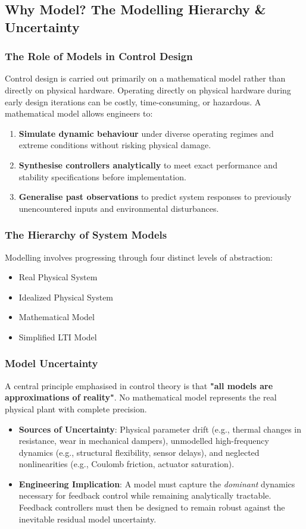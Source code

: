 \documentclass[12pt,onecolumn,twoside ]{article}
\begin{document}
	\subsection{Why Model? The Modelling Hierarchy \& Uncertainty}
	\subsubsection{The Role of Models in Control Design}
	Control design is carried out primarily on a mathematical model rather than directly on physical hardware. Operating directly on physical hardware during early design iterations can be costly, time-consuming, or hazardous. A mathematical model allows engineers to:
	\begin{enumerate}
		\item
		\textbf{Simulate dynamic behaviour} under diverse operating regimes and extreme conditions without risking physical damage.
		\item
		\textbf{Synthesise controllers analytically} to meet exact performance and stability specifications before implementation.
		\item
		\textbf{Generalise past observations} to predict system responses to previously unencountered inputs and environmental disturbances.
	\end{enumerate}
	\subsubsection{The Hierarchy of System Models}
	Modelling involves progressing through four distinct levels of abstraction:
	
	\begin{itemize}
		\item Real Physical System
		\item Idealized Physical System
		\item Mathematical Model
		\item Simplified LTI Model
	\end{itemize}
	
	\subsubsection{Model Uncertainty}
	A central principle emphasised in control theory is that \textbf{"all models are approximations of reality"}. No mathematical model represents the real physical plant with complete precision.
	\begin{itemize}
		\item
		\textbf{Sources of Uncertainty}: Physical parameter drift (e.g., thermal changes in resistance, wear in mechanical dampers), unmodelled high-frequency dynamics (e.g., structural flexibility, sensor delays), and neglected nonlinearities (e.g., Coulomb friction, actuator saturation).
		\item
		\textbf{Engineering Implication}: A model must capture the \textit{dominant} dynamics necessary for feedback control while remaining analytically tractable. Feedback controllers must then be designed to remain robust against the inevitable residual model uncertainty.
	\end{itemize}
	
\end{document}
